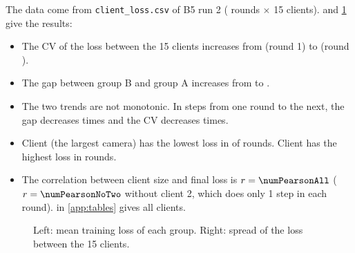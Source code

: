 The data come from \texttt{client\_loss.csv} of B5 run 2 (\numLastRound{} rounds $\times$ 15 clients).  and \cref{fig:group} give the results:
\begin{itemize}[leftmargin=1.5em]
  \item The CV of the loss between the 15 clients increases from \numCVFirst{} (round 1) to \numCVLast{} (round \numLastRound).
  \item The gap between group B and group A increases from \numGapFirst{} to \numGapLast.
  \item The two trends are not monotonic. In \numSteps{} steps from one round to the next, the gap decreases \numGapDown{} times and the CV decreases \numCVDown{} times.
  \item Client \numLowClient{} (the largest camera) has the lowest loss in \numLowCount{} of \numLastRound{} rounds. Client \numHiOne{} has the highest loss in \numHiOneCount{} rounds.
  \item The correlation between client size and final loss is $r=\numPearsonAll$ ($r=\numPearsonNoTwo$ without client 2, which does only 1 step in each round).  in \cref{app:tables} gives all clients.
\end{itemize}

\begin{table}[t]
\centering\small
\caption{Mean SDM training loss of each camera group, B5 run 2. The CV uses the 15 clients (population standard deviation / mean).}\label{tab:group}

\end{table}

\begin{figure}[t]
\centering
{}
\caption{Left: mean training loss of each group. Right: spread of the loss between the 15 clients.}
\label{fig:group}
\end{figure}

